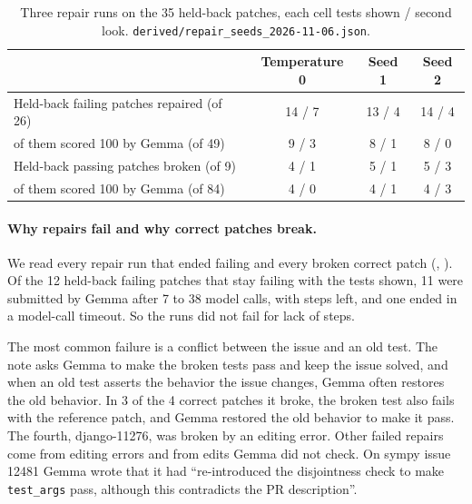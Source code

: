 \documentclass[10pt,letterpaper]{article}
\begin{document}
\begin{table}[H]
\centering
\small
\caption{Three repair runs on the 35 held-back patches, each cell tests shown / second look.
\texttt{derived/repair\_seeds\_2026-11-06.json}.}
\label{tab:repair-seeds}
\begin{tabular}{@{}lccc@{}}
\toprule
 & Temperature 0 & Seed 1 & Seed 2 \\
\midrule
Held-back failing patches repaired (of 26) & 14 / 7 & 13 / 4 & 14 / 4 \\
\quad of them scored 100 by Gemma (of 49) & 9 / 3 & 8 / 1 & 8 / 0 \\
Held-back passing patches broken (of 9) & 4 / 1 & 5 / 1 & 5 / 3 \\
\quad of them scored 100 by Gemma (of 84) & 4 / 0 & 4 / 1 & 4 / 3 \\
\bottomrule
\end{tabular}
\end{table}

\paragraph{Why repairs fail and why correct patches break.} We read every repair run that ended failing and every
broken correct patch (, ).
Of the 12 held-back failing patches that stay failing with the tests shown, 11 were submitted by Gemma after 7 to 38
model calls, with steps left, and one ended in a model-call timeout. So the runs did not fail for lack of steps.

The most common failure is a conflict between the issue and an old test. The note asks Gemma to make the broken tests pass and
keep the issue solved, and when an old test asserts the behavior the issue changes, Gemma often restores the old
behavior. In 3 of the 4 correct patches it broke, the broken test also fails with the reference patch, and Gemma
restored the old behavior to make it pass. The fourth, django-11276, was broken by an editing error. Other failed
repairs come from editing errors and from edits Gemma did not check. On sympy issue
12481 Gemma wrote that it had ``re-introduced the disjointness check to make \texttt{test\_args} pass, although this
contradicts the PR description''.
\end{document}
